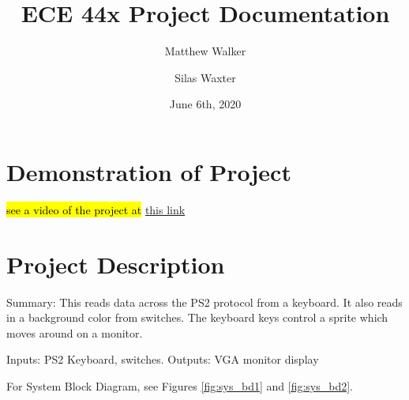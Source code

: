 \documentclass[a4paper]{article}
\title{ECE 44x Project Documentation}
\title
\author{Matthew Walker \and Silas Waxter}
\date{June 6th, 2020}
\begin{document}

\maketitle
\tableofcontents
\newpage

\section{Demonstration of Project}
\hl{see a video of the project at }\href{https://vimeo.com/717762161}{this link}

\section{Project Description}
Summary: This reads data across the PS2 protocol from a keyboard.  It also reads in a background color from switches.  The keyboard keys control a sprite which moves around on a monitor.

Inputs:     PS2 Keyboard, switches.
Outputs:    VGA monitor display

For System Block Diagram, see Figures \ref{fig:sys_bd1} and \ref{fig:sys_bd2}. 
\end{document}
